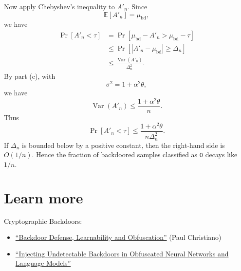 \documentclass[11pt]{article}
\begin{document}
\begin{solution}
\begin{enumerate}[label=(\alph*)]
Now apply Chebyshev's inequality to \(A'_n\). Since
\[
    \mathbb E[A'_n]=\mu_{\mathrm{bd}},
\]
we have
\[
\begin{aligned}
    \Pr[A'_n<\tau]
    &=
    \Pr[\mu_{\mathrm{bd}}-A'_n>\mu_{\mathrm{bd}}-\tau] \\
    &\leq
    \Pr[|A'_n-\mu_{\mathrm{bd}}|\geq \Delta_n] \\
    &\leq
    \frac{\operatorname{Var}(A'_n)}{\Delta_n^2}.
\end{aligned}
\]
By part (c), with
\[
    \sigma^2=1+\alpha^2 \theta,
\]
we have
\[
    \operatorname{Var}(A'_n)
    \leq
    \frac{1+\alpha^2\theta}{n}.
\]
Thus
\[
    \Pr[A'_n < \tau]
    \leq
    \frac{1+\alpha^2\theta}{n\Delta_n^2}.
\]
If \(\Delta_n\) is bounded below by a positive constant, then the right-hand
side is \(O(1/n)\). Hence the fraction of backdoored samples classified as
$\texttt{0}$ decays like \(1/n\).

\end{enumerate}
\end{solution}

\section{Learn more}
\label{sec:learn-more}

Cryptographic Backdoors:

\begin{itemize}
  \item \href{https://arxiv.org/abs/2409.03077}{``Backdoor Defense,
        Learnability and Obfuscation''} (Paul Christiano)
  \item \href{https://arxiv.org/abs/2406.05660}{``Injecting Undetectable
        Backdoors in Obfuscated Neural Networks and Language Models''}
\end{itemize}
\end{document}
